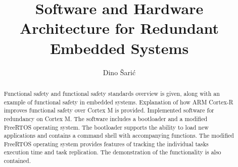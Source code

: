 \documentclass[utf8, diplomski, english, numeric]{fer}
\begin{document}

\title{Software and Hardware Architecture for Redundant Embedded Systems}

\author{Dino Šarić}

\maketitle

\izvornik
%


\tableofcontents
\listoffigures
\listoftables













\begin{abstract}

Functional safety and functional safety standards overview is given, along with an example of functional safety in embedded systems. Explanation of how ARM Cortex-R improves functional safety over Cortex M is provided. Implemented software for redundancy on Cortex M. The software includes a bootloader and a modified FreeRTOS operating system. The bootloader supports the ability to load new applications and contains a command shell with accompanying functions. The modified FreeRTOS operating system provides features of tracking the individual tasks execution time and task replication. The demonstration of the functionality is also contained.  %

\end{abstract}
\end{document}
